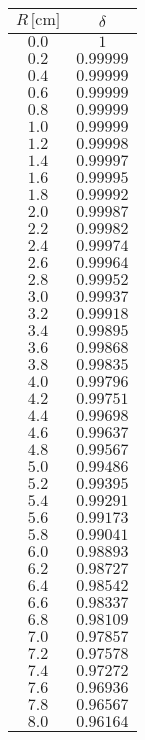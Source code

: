 \documentclass[]{article}
\begin{document}
\begin{table}
    \centering

\begin{tabular}{||c|c||}
    \hline
    $R \, \text{[cm]} $ & $ \delta $\\
    \hline\hline



    $0.0$ & $1$ \\\hline
    $0.2$ & $0.99999$ \\\hline
    $0.4$ & $0.99999$ \\\hline
    $0.6$ & $0.99999$ \\\hline
    $0.8$ & $0.99999$ \\\hline
    $1.0$ & $0.99999$ \\\hline
    $1.2$ & $0.99998$ \\\hline
    $1.4$ & $0.99997$ \\\hline
    $1.6$ & $0.99995$ \\\hline
    $1.8$ & $0.99992$ \\\hline
    $2.0$ & $0.99987$ \\\hline
    $2.2$ & $0.99982$ \\\hline
    $2.4$ & $0.99974$ \\\hline
    $2.6$ & $0.99964$ \\\hline
    $2.8$ & $0.99952$ \\\hline
    $3.0$ & $0.99937$ \\\hline
    $3.2$ & $0.99918$ \\\hline
    $3.4$ & $0.99895$ \\\hline
    $3.6$ & $0.99868$ \\\hline
    $3.8$ & $0.99835$ \\\hline
    $4.0$ & $0.99796$ \\\hline
    $4.2$ & $0.99751$ \\\hline
    $4.4$ & $0.99698$ \\\hline
    $4.6$ & $0.99637$ \\\hline
    $4.8$ & $0.99567$ \\\hline
    $5.0$ & $0.99486$ \\\hline
    $5.2$ & $0.99395$ \\\hline
    $5.4$ & $0.99291$ \\\hline
    $5.6$ & $0.99173$ \\\hline
    $5.8$ & $0.99041$ \\\hline
    $6.0$ & $0.98893$ \\\hline
    $6.2$ & $0.98727$ \\\hline
    $6.4$ & $0.98542$ \\\hline
    $6.6$ & $0.98337$ \\\hline
    $6.8$ & $0.98109$ \\\hline
    $7.0$ & $0.97857$ \\\hline
    $7.2$ & $0.97578$ \\\hline
    $7.4$ & $0.97272$ \\\hline
    $7.6$ & $0.96936$ \\\hline
    $7.8$ & $0.96567$ \\\hline
    $8.0$ & $0.96164$ \\\hline


\end{tabular}
\end{table}
\end{document}
